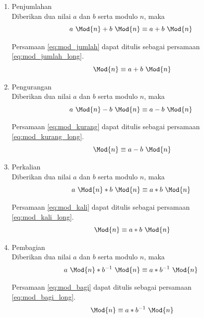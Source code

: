 \begin{enumerate}
\item Penjumlahan \\
	Diberikan dua nilai $ a $ dan $ b $ serta modulo $ n $, maka 
	\begin{equation}
		a\ \Mod{n}+b\ \Mod{n}\equiv a+b\ \Mod{n}
		\label {eq:mod_jumlah}
	\end{equation}

	Persamaan \eqref{eq:mod_jumlah} dapat ditulis sebagai persamaan \eqref{eq:mod_jumlah_long}.
	\begin{equation}
		[a\ \Mod{n}+b\ \Mod{n}]\ \Mod{n}\equiv a+b\ \Mod{n}
		\label {eq:mod_jumlah_long}
	\end{equation}

\item Pengurangan \\
	Diberikan dua nilai $ a $ dan $ b $ serta modulo $ n $, maka 
	\begin{equation}
		a\ \Mod{n}-b\ \Mod{n}\equiv a-b\ \Mod{n}
		\label{eq:mod_kurang}
	\end{equation}

	Persamaan \eqref{eq:mod_kurang} dapat ditulis sebagai persamaan \eqref{eq:mod_kurang_long}.
	\begin{equation}
		[a\ \Mod{n}-b\ \Mod{n}]\ \Mod{n}\equiv a-b\ \Mod{n}
		\label {eq:mod_kurang_long}
	\end{equation}

\item Perkalian \\
	Diberikan dua nilai $ a $ dan $ b $ serta modulo $ n $, maka 
	\begin{equation}
		a\ \Mod{n}*b\ \Mod{n}\equiv a*b\ \Mod{n}
		\label{eq:mod_kali}
	\end{equation}

	Persamaan \eqref{eq:mod_kali} dapat ditulis sebagai persamaan \eqref{eq:mod_kali_long}.
	\begin{equation}
		[a\ \Mod{n}*b\ \Mod{n}]\ \Mod{n}\equiv a*b\ \Mod{n}
		\label{eq:mod_kali_long}
	\end{equation}

\item Pembagian \\
	Diberikan dua nilai $ a $ dan $ b $ serta modulo $ n $, maka 
	\begin{equation}
		a\ \Mod{n}* b^{-1}\ \Mod{n}\equiv a*b^{-1}\ \Mod{n}
		\label{eq:mod_bagi}
	\end{equation}

	Persamaan \eqref{eq:mod_bagi} dapat ditulis sebagai persamaan \eqref{eq:mod_bagi_long}.
	\begin{equation}
		[a\ \Mod{n}*b^{-1}\ \Mod{n}]\ \Mod{n}\equiv a*b^{-1}\ \Mod{n}
		\label{eq:mod_bagi_long}
	\end{equation}


\end{enumerate}
